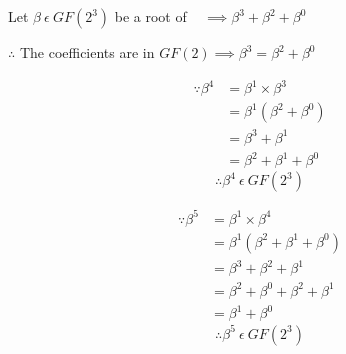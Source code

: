         \hspace*{\fill}
        \centerline{Let $\beta \ \epsilon \ GF(2^{3})$ be a root of
        \examplepoly~ $\implies \beta^{3} + \beta^{2} + \beta^{0}$}
        \hspace*{\fill}
        \centerline{$\therefore$ The coefficients are in $GF(2) \implies
        \beta^{3} = \beta^{2} + \beta^{0}$}
        \begin{minipage}[t]{0.5\textwidth}
            \begin{equation*}
                \begin{split}
                    \because \beta^{4} & = \beta^{1} \times \beta^{3} \\
                    & = \beta^{1} (\beta^{2}+\beta^{0}) \\
                    & = \beta^{3}+\beta^{1} \\
                    & = \beta^{2}+\beta^{1}+\beta^{0}
                \end{split}
            \end{equation*}
            \[ \therefore \beta^{4} \ \epsilon \ GF(2^{3}) \]
        \end{minipage}
        \begin{minipage}[t]{0.5\textwidth}
            \begin{equation*}
                \begin{split}
                    \because \beta^{5} & = \beta^{1} \times \beta^{4} \\
                    & = \beta^{1} (\beta^{2}+\beta^{1}+\beta^{0}) \\
                    & = \beta^{3}+\beta^{2}+\beta^{1} \\
                    & = \beta^{2}+\beta^{0}+\beta^{2}+\beta^{1} \\
                    & = \beta^{1}+\beta^{0}
                \end{split}
            \end{equation*}
            \[ \therefore \beta^{5} \ \epsilon \ GF(2^{3}) \]
        \end{minipage}


